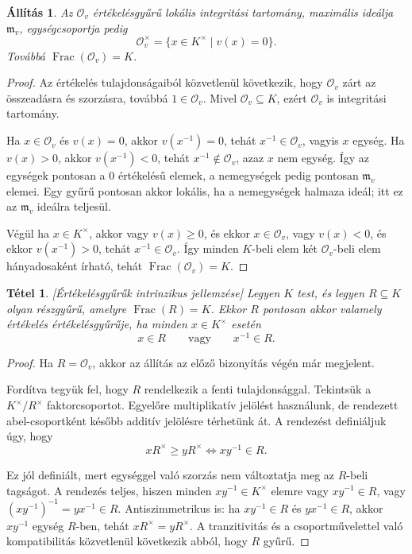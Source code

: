 \documentclass[11pt,a4paper]{article}
\theoremstyle{definition}
\theoremstyle{plain}
\newtheorem{theorem}[definition]{Tétel}
\newtheorem{proposition}[definition]{Állítás}
\begin{document}
{\begin{proposition}
Az $\mathcal O_v$ értékelésgyűrű lokális integritási tartomány, maximális
ideálja $\mathfrak m_v$, egységcsoportja pedig
\[
\mathcal O_v^\times
=
\{x \in K^\times \mid v(x)=0\}.
\]
Továbbá $\operatorname{Frac}(\mathcal O_v)=K$.
\end{proposition}

\begin{proof}
Az értékelés tulajdonságaiból közvetlenül következik, hogy $\mathcal O_v$
zárt az összeadásra és szorzásra, továbbá $1\in\mathcal O_v$. Mivel
$\mathcal O_v \subseteq K$, ezért $\mathcal O_v$ is integritási tartomány.

Ha $x\in\mathcal O_v$ és $v(x)=0$, akkor $v(x^{-1})=0$, tehát
$x^{-1}\in\mathcal O_v$, vagyis $x$ egység. Ha $v(x)>0$, akkor
$v(x^{-1})<0$, tehát $x^{-1}\notin\mathcal O_v$, azaz $x$ nem egység.
Így az egységek pontosan a $0$ értékelésű elemek, a nemegységek pedig
pontosan $\mathfrak m_v$ elemei. Egy gyűrű pontosan akkor lokális,
ha a nemegységek halmaza ideál; itt ez az $\mathfrak m_v$ ideálra teljesül.

Végül ha $x\in K^\times$, akkor vagy $v(x)\ge 0$, és ekkor
$x\in\mathcal O_v$, vagy $v(x)<0$, és ekkor $v(x^{-1})>0$, tehát
$x^{-1}\in\mathcal O_v$. Így minden $K$-beli elem két
$\mathcal O_v$-beli elem hányadosaként írható, tehát
$\operatorname{Frac}(\mathcal O_v)=K$.
\end{proof}

\begin{theorem}\label{tetel23}[Értékelésgyűrűk intrinzikus jellemzése]
Legyen $K$ test, és legyen $R\subseteq K$ olyan részgyűrű, amelyre
$\operatorname{Frac}(R)=K$. Ekkor $R$ pontosan akkor valamely
értékelés értékelésgyűrűje, ha minden $x\in K^\times$ esetén
\[
x\in R
\qquad \text{vagy} \qquad
x^{-1}\in R.
\]
\end{theorem}

\begin{proof}
Ha $R=\mathcal O_v$, akkor az állítás az előző bizonyítás végén már
megjelent.

Fordítva tegyük fel, hogy $R$ rendelkezik a fenti tulajdonsággal.
Tekintsük a $K^\times/R^\times$ faktorcsoportot. Egyelőre multiplikatív
jelölést használunk, de rendezett abel-csoportként később additív
jelölésre térhetünk át. A rendezést definiáljuk úgy, hogy
\[
xR^\times \ge yR^\times
\iff
xy^{-1}\in R.
\]

Ez jól definiált, mert egységgel való szorzás nem változtatja meg az
$R$-beli tagságot. A rendezés teljes, hiszen minden $xy^{-1}\in K^\times$
elemre vagy $xy^{-1}\in R$, vagy $(xy^{-1})^{-1}=yx^{-1}\in R$.
Antiszimmetrikus is: ha $xy^{-1}\in R$ és $yx^{-1}\in R$, akkor
$xy^{-1}$ egység $R$-ben, tehát $xR^\times=yR^\times$.
A tranzitivitás és a csoportművelettel való kompatibilitás közvetlenül
következik abból, hogy $R$ gyűrű.


\end{proof}}
\end{document}

